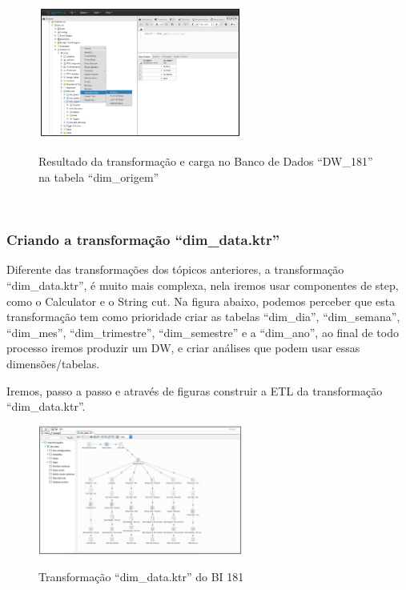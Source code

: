 \begin{figure}[H]
	\vspace*{0,2cm}
    \centering
    \caption{Resultado da transforma\c{c}\~{a}o e carga no Banco de Dados ``DW\_181'' na tabela ``dim\_origem''}
    \includegraphics[width=0.6\textwidth]{./04-figuras/figura-res-dim-origem}
    \label{fig:ilustfigresdimorigem}
\end{figure}
\vspace*{-0,9cm}
{\raggedright {}} \\

\subsubsection{Criando a transforma\c{c}\~{a}o ``dim\_data.ktr''}

Diferente das transforma\c{c}\~{o}es dos t\'{o}picos anteriores, a transforma\c{c}\~{a}o ``dim\_data.ktr'', 
\'{e} muito mais complexa, nela iremos usar componentes de step, como o Calculator e o String cut. 
Na figura abaixo, podemos perceber que esta transforma\c{c}\~{a}o tem como prioridade criar 
as tabelas ``dim\_dia'', ``dim\_semana'', ``dim\_mes'', ``dim\_trimestre'', ``dim\_semestre'' e 
a ``dim\_ano'', ao final de todo processo iremos produzir um DW, e criar an\'{a}lises que podem 
usar essas dimens\~{o}es/tabelas.

Iremos, passo a passo e atrav\'{e}s de figuras construir a ETL da transforma\c{c}\~{a}o ``dim\_data.ktr''.

\begin{figure}[H]
	\vspace*{0,2cm}
    \centering
    \caption{Transforma\c{c}\~{a}o ``dim\_data.ktr'' do BI 181}
    \includegraphics[width=0.6\textwidth]{./04-figuras/figura-dim-data}
    \label{fig:ilustfigresdimdata}
\end{figure}
\vspace*{-0,9cm}
{\raggedright {}} \\

